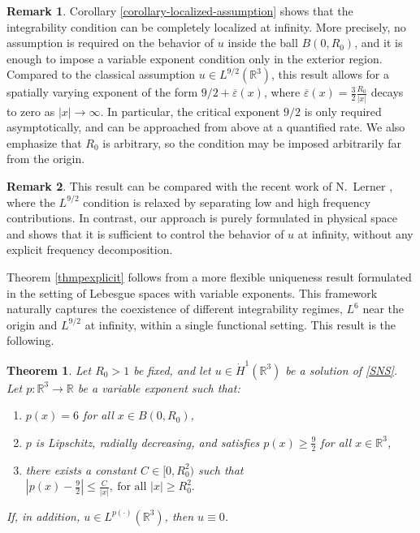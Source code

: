 \documentclass[a4paper,12pt]{amsart}
\theoremstyle{definition}
\newtheorem{remark}{Remark}[section]
\theoremstyle{plain}
\newtheorem{theorem}{Theorem}[section]
\begin{document}
\begin{remark}
Corollary \ref{corollary-localized-assumption} shows that the integrability condition can be completely localized at infinity. More precisely, no assumption is required on the behavior of $u$ inside the ball $B(0,R_0)$, and it is enough to impose a variable exponent condition only in the exterior region. 
Compared to the classical assumption $u \in L^{9/2}(\mathbb{R}^3)$, this result allows for a spatially varying exponent of the form $9/2 + \overline{\varepsilon}(x)$, where $\overline{\varepsilon}(x) = \frac{3}{2}\frac{R_0}{|x|}$ decays to zero as $|x| \to \infty$. In particular, the critical exponent $9/2$ is only required asymptotically, and can be approached from above at a quantified rate.
 We also emphasize that $R_0$ is arbitrary, so the condition may be imposed arbitrarily far from the origin.
\end{remark} 

 \begin{remark}
This result can be compared with the recent work of N.~Lerner \cite{Lerner26}, where the $L^{9/2}$ condition is relaxed by separating low and high frequency contributions. In contrast, our approach is purely formulated in physical space and shows that it is sufficient to control the behavior of $u$ at infinity, without any explicit frequency decomposition.
\end{remark} 


Theorem \ref{thmpexplicit} follows from a more flexible uniqueness result formulated in the setting of Lebesgue spaces with variable exponents. This framework naturally captures the coexistence of different integrability regimes, $L^6$ near the origin and $L^{9/2}$ at infinity, within a single functional setting. 
This result is the following.
\begin{theorem}\label{thm:over92}
Let $R_0 > 1$ be fixed, and let $u \in \dot{H}^1(\mathbb{R}^3)$ be a solution of \eqref{SNS}. Let $p:\mathbb{R}^3 \to \mathbb{R}$ be a variable exponent such that:
\begin{enumerate}
\item $p(x) = 6$ for all $x \in B(0,R_0)$,
\item $p$ is 
Lipschitz,  
 radially decreasing, and satisfies $p(x) \ge \frac{9}{2}$ for all $x \in \mathbb{R}^3$,
\item there exists a constant $C \in [0, R_0^2)$ such that
$
|p(x) - \tfrac{9}{2}| \le \frac{C}{|x|}, \  \text{for all } |x| \ge R_0^2.
$
\end{enumerate}
If, in addition, $u \in L^{p(\cdot)}(\mathbb{R}^3)$, then $u \equiv 0$.
\end{theorem}
 
\end{document}
